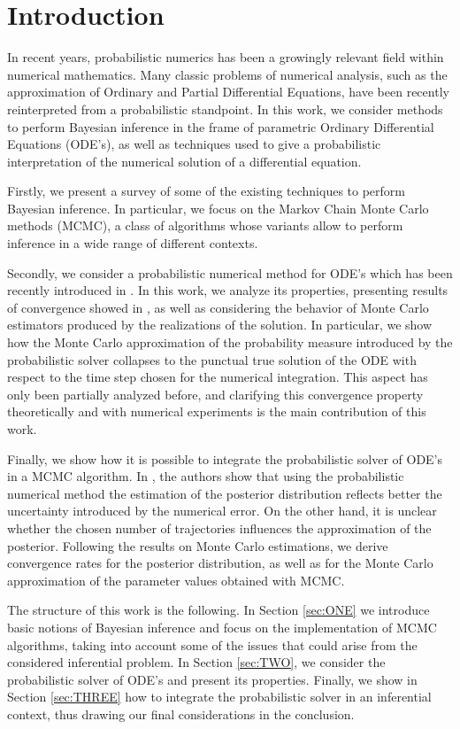 \section{Introduction}

In recent years, probabilistic numerics has been a growingly relevant field within numerical mathematics. Many classic problems of numerical analysis, such as the approximation of Ordinary and Partial Differential Equations, have been recently reinterpreted from a probabilistic standpoint. In this work, we consider methods to perform Bayesian inference in the frame of parametric Ordinary Differential Equations (ODE's), as well as techniques used to give a probabilistic interpretation of the numerical solution of a differential equation. 

Firstly, we present a survey of some of the existing techniques to perform Bayesian inference. In particular, we focus on the Markov Chain Monte Carlo methods (MCMC), a class of algorithms whose variants allow to perform inference in a wide range of different contexts. 

Secondly, we consider a probabilistic numerical method for ODE's which has been recently introduced in \cite{CGS16}. In this work, we analyze its properties, presenting results of convergence showed in \cite{CGS16}, as well as considering the behavior of Monte Carlo estimators produced by the realizations of the solution. In particular, we show how the Monte Carlo approximation of the probability measure introduced by the probabilistic solver collapses to the punctual true solution of the ODE with respect to the time step chosen for the numerical integration. This aspect has only been partially analyzed before, and clarifying this convergence property theoretically and with numerical experiments is the main contribution of this work.

Finally, we show how it is possible to integrate the probabilistic solver of ODE's in a MCMC algorithm. In \cite{CGS16}, the authors show that using the probabilistic numerical method the estimation of the posterior distribution reflects better the uncertainty introduced by the numerical error. On the other hand, it is unclear whether the chosen number of trajectories influences the approximation of the posterior. Following the results on Monte Carlo estimations, we derive convergence rates for the posterior distribution, as well as for the Monte Carlo approximation of the parameter values obtained with MCMC.

The structure of this work is the following. In Section \ref{sec:ONE} we introduce basic notions of Bayesian inference and focus on the implementation of MCMC algorithms, taking into account some of the issues that could arise from the considered inferential problem. In Section \ref{sec:TWO}, we consider the probabilistic solver of ODE's and present its properties. Finally, we show in Section \ref{sec:THREE} how to integrate the probabilistic solver in an inferential context, thus drawing our final considerations in the conclusion.
